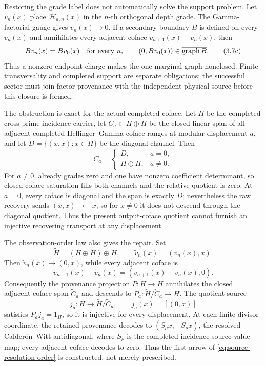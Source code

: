 \documentclass[11pt]{article}
\theoremstyle{definition}
\theoremstyle{remark}
\begin{document}
Restoring the grade label does not automatically solve the support problem.
Let \(v_n(x)\) place \(\mathcal H_{a,n}(x)\) in the \(n\)-th orthogonal
depth grade.  The Gamma-factorial gauge gives \(v_n(x)\to0\).  If a
secondary boundary \(B\) is defined on every \(v_n(x)\) and annihilates
every adjacent coface \(v_{n+1}(x)-v_n(x)\), then
\[
 Bv_n(x)=Bv_0(x)\quad\hbox{for every }n,
 \qquad (0,Bv_0(x))\in\overline{\operatorname{graph}B}.
\tag{3.7c}\label{eq:hellinger-vertical}
\]
Thus a nonzero endpoint charge makes the one-marginal graph nonclosed.
Finite transversality and completed support are separate obligations; the
successful sector must join factor provenance with the independent
physical source before this closure is formed.

The obstruction is exact for the actual completed coface.  Let \(H\) be
the completed cross-prime incidence carrier, let \(C_a\subset H\oplus H\)
be the closed linear span of all adjacent completed Hellinger--Gamma coface
ranges at modular displacement \(a\), and let \(D=\{(x,x):x\in H\}\) be
the diagonal channel.  Then
\[
                         C_a=
 \begin{cases}
 D,&a=0,\\
 H\oplus H,&a\ne0.
 \end{cases}
\tag{3.7ca}\label{eq:coface-saturation-phase}
\]
For \(a\ne0\), already grades zero and one have nonzero coefficient
determinant, so closed coface saturation fills both channels and the
relative quotient is zero.  At \(a=0\), every coface is diagonal and the
span is exactly \(D\); nevertheless the raw recovery sends
\((x,x)\mapsto-x\), so for \(x\ne0\) it does not descend through the
diagonal quotient.  Thus the present output-coface quotient cannot furnish
an injective recovering transport at any displacement.

The observation-order law also gives the repair.  Set
\[
 \widetilde H=(H\oplus H)\oplus H,\qquad
 \widetilde v_n(x)=(v_n(x),x).
\tag{3.7cb}\label{eq:resolved-provenance-vertex}
\]
Then \(\widetilde v_n(x)\to(0,x)\), while every adjacent coface is
\[
 \widetilde v_{n+1}(x)-\widetilde v_n(x)
       =(v_{n+1}(x)-v_n(x),0).
\tag{3.7cc}\label{eq:resolved-provenance-coface}
\]
Consequently the provenance projection \(P:\widetilde H\to H\) annihilates
the closed adjacent-coface span \(\widetilde C_a\) and descends to
\(\overline P_a:\widetilde H/\widetilde C_a\to H\).  The quotient source
\[
 j_a:H\longrightarrow\widetilde H/\widetilde C_a,\qquad
 j_a(x)=[(0,x)]
\tag{3.7cd}\label{eq:resolved-provenance-split}
\]
satisfies \(\overline P_a j_a=1_H\), so it is injective for every
displacement.  At each finite divisor coordinate, the retained provenance
decodes to \((S_\rho x,-S_\rho x)\), the resolved Calder\'on--Witt
antidiagonal, where \(S_\rho\) is the completed incidence source-value map;
every adjacent coface decodes to zero.  Thus the first
arrow of \eqref{eq:source-resolution-order} is constructed, not merely
prescribed.
\end{document}

